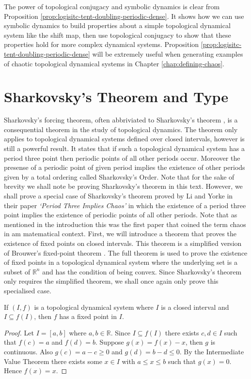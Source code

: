 The power of topological conjugacy and symbolic dynamics is clear from Proposition \ref{prop:logisitc-tent-doubling-periodic-dense}. It shows how we can use symbolic dynamics to build properties about a simple topological dynamical system like the shift map, then use topological conjugacy to show that these properties hold for more complex dynamical systems. Proposition \ref{prop:logisitc-tent-doubling-periodic-dense} will be extremely useful when generating examples of chaotic topological dynamical systems in Chapter \ref{chap:defining-chaos}.

\section{Sharkovsky's Theorem and Type}\label{sec:sharkovskys-theorem-and-type}
Sharkovsky's forcing theorem, often abbriviated to Sharkovsky's theorem \cite{sharkovsky}, is a consequential theorem in the study of topological dynamics. The theorem only applies to topological dynamical systems defined over closed intervals, however is still a powerful result. It states that if such a topological dynamical system has a period three point then periodic points of all other periods occur. Moreover the presense of a periodic point of given period implies the existence of other periods given by a total ordering called Sharkovsky's Order. Note that for the sake of brevity we shall note be proving Sharkovsky's theorem in this text. However, we shall prove a special case of Sharkovsky's theorem proved by Li and Yorke in their paper \emph{`Period Three Implies Chaos'} \cite{li-yorke} in which the existence of a period three point implies the existence of periodic points of all other periods. Note that as mentioned in the introduction this was the first paper that coined the term chaos in am matematical context. First, we will introduce a theorem that proves the existence of fixed points on closed intervals. This theorem is a simplified version of Brouwer's fixed-point theorem \cite{brouwer}. The full theorem is used to prove the existence of fixed points in a topological dynamical system where the underlying set is a subset of $\mathbb{R}^n$ and has the condition of being convex. Since Sharkovsky's theorem only requires the simplified theorem, we shall once again only prove this specialised case.

\begin{thm} \label{thm:interval-fixed-points}
    If $(I, f)$ is a topological dynamical system where $I$ is a closed interval and $I \subseteq f(I)$, then $f$ has a fixed point in $I$.
    \begin{proof}
        Let $I = [a, b]$ where $a, b \in \mathbb{R}$. Since $I \subseteq f(I)$ there exists $c, d \in I$ such that $f(c) = a$ and $f(d) = b$. Suppose $g(x) = f(x) - x$, then $g$ is continuous. Also $g(c) = a - c \geq 0$ and $g(d) = b - d \leq 0$. By the Intermediate Value Theorem there exists some $x \in I$ with $a \leq x \leq b$ such that $g(x) = 0$. Hence $f(x) = x$.
    \end{proof}
\end{thm}

